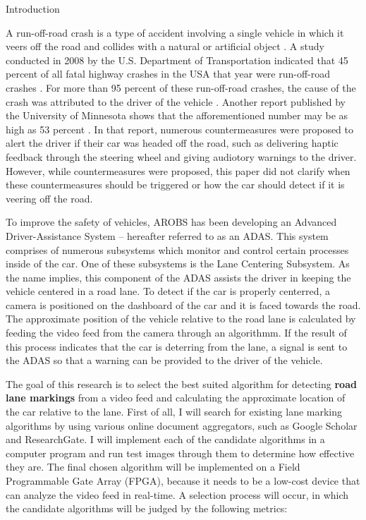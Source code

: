 \documentclass{matthijs}
\begin{document}

	\begin{hoofdstuk}{Introduction}

		A run-off-road crash is a type of accident involving a single vehicle in which it veers off the road and collides with a natural or artificial object \cite{liu2009factors}.
		A study conducted in 2008 by the U.S. Department of Transportation indicated that 45 percent of all fatal highway crashes in the USA that year were run-off-road crashes \cite{dod2011run}.
		For more than 95 percent of these run-off-road crashes, the cause of the crash was attributed to the driver of the vehicle \cite{dod2011run}.
		Another report published by the University of Minnesota shows that the afforementioned number may be as high as 53 percent \cite{edwards2013pilot}.
		In that report, numerous countermeasures were proposed to alert the driver if their car was headed off the road, such as delivering haptic feedback through the steering wheel and giving audiotory warnings to the driver.
		However, while countermeasures were proposed, this paper did not clarify when these countermeasures should be triggered or how the car should detect if it is veering off the road.
		
		\bigskip

		To improve the safety of vehicles, AROBS has been developing an Advanced Driver-Assistance System -- hereafter referred to as an ADAS.
		This system comprises of numerous subsystems which monitor and control certain processes inside of the car.
		One of these subsystems is the Lane Centering Subsystem.
		As the name implies, this component of the ADAS assists the driver in keeping the vehicle centered in a road lane.
		To detect if the car is properly centerred, a camera is positioned on the dashboard of the car and it is faced towards the road.
		The approximate position of the vehicle relative to the road lane is calculated by feeding the video feed from the camera through an algorithmm.
		If the result of this process indicates that the car is deterring from the lane, a signal is sent to the ADAS so that a warning can be provided to the driver of the vehicle.
		
		\bigskip

		The goal of this research is to select the best suited algorithm for detecting \textbf{road lane markings} from a video feed and calculating the approximate location of the car relative to the lane.
		First of all, I will search for existing lane marking algorithms by using various online document aggregators, such as Google Scholar and ResearchGate.
		I will implement each of the candidate algorithms in a computer program and run test images through them to determine how effective they are.
		The final chosen algorithm will be implemented on a Field Programmable Gate Array (FPGA), because it needs to be a low-cost device that can analyze the video feed in real-time.
		A selection process will occur, in which the candidate algorithms will be judged by the following metrics:


\end{hoofdstuk}
\end{document}
